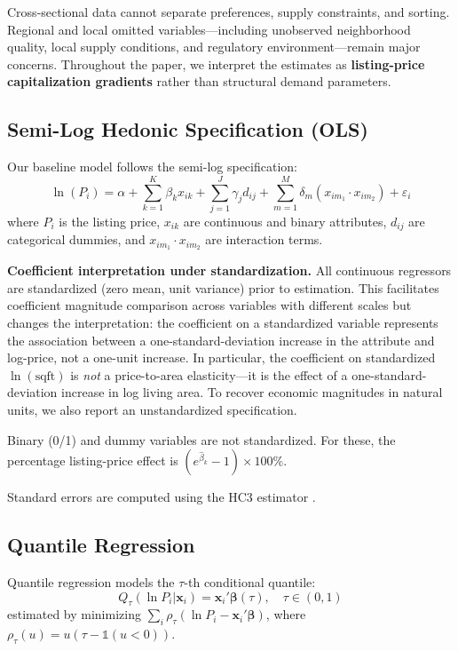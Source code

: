 Cross-sectional data cannot separate preferences, supply constraints, and sorting. Regional and local omitted variables---including unobserved neighborhood quality, local supply conditions, and regulatory environment---remain major concerns. Throughout the paper, we interpret the estimates as \textbf{listing-price capitalization gradients} rather than structural demand parameters.

\subsection{Semi-Log Hedonic Specification (OLS)}

Our baseline model follows the semi-log specification:
\begin{equation}
    \ln(P_i) = \alpha + \sum_{k=1}^{K} \beta_k x_{ik} + \sum_{j=1}^{J} \gamma_j d_{ij} + \sum_{m=1}^{M} \delta_m (x_{im_1} \cdot x_{im_2}) + \varepsilon_i
    \label{eq:ols}
\end{equation}
where $P_i$ is the listing price, $x_{ik}$ are continuous and binary attributes, $d_{ij}$ are categorical dummies, and $x_{im_1} \cdot x_{im_2}$ are interaction terms.

\textbf{Coefficient interpretation under standardization.} All continuous regressors are standardized (zero mean, unit variance) prior to estimation. This facilitates coefficient magnitude comparison across variables with different scales but changes the interpretation: the coefficient on a standardized variable represents the association between a one-standard-deviation increase in the attribute and log-price, not a one-unit increase. In particular, the coefficient on standardized $\ln(\text{sqft})$ is \textit{not} a price-to-area elasticity---it is the effect of a one-standard-deviation increase in log living area. To recover economic magnitudes in natural units, we also report an unstandardized specification.

Binary (0/1) and dummy variables are not standardized. For these, the percentage listing-price effect is $(e^{\hat{\beta}_k} - 1) \times 100\%$.

Standard errors are computed using the HC3 estimator \citep{white1980heteroskedasticity, mackinnon1985some}.

\subsection{Quantile Regression}
\label{sec:qr_methodology}

Quantile regression \citep{koenker1978regression, koenker2001quantile} models the $\tau$-th conditional quantile:
\begin{equation}
    Q_{\tau}(\ln P_i | \mathbf{x}_i) = \mathbf{x}_i' \boldsymbol{\beta}(\tau), \quad \tau \in (0, 1)
\end{equation}
estimated by minimizing $\sum_{i} \rho_{\tau}(\ln P_i - \mathbf{x}_i' \boldsymbol{\beta})$, where $\rho_{\tau}(u) = u(\tau - \mathbb{1}(u < 0))$.

